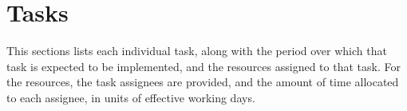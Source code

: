 \section{Tasks}

This sections lists each individual task, along with the period over which that task is expected to be implemented, and the resources assigned to that task. 
For the resources, the task assignees are provided, and the amount of time allocated to each assignee, in units of effective working days.


